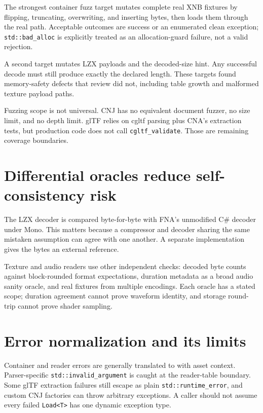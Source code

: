 The strongest container fuzz target mutates complete real XNB fixtures by flipping, truncating,
overwriting, and inserting bytes, then loads them through the real
 path.  Acceptable outcomes are success or an enumerated clean
exception; \texttt{std::bad\_alloc} is explicitly treated as an allocation-guard failure, not a
valid rejection.

A second target mutates LZX payloads and the decoded-size hint.  Any successful decode must still
produce exactly the declared length.  These targets found memory-safety defects that review did
not, including table growth and malformed texture payload paths.

Fuzzing scope is not universal.  CNJ has no equivalent document fuzzer, no size limit, and no
depth limit.  glTF relies on cgltf parsing plus CNA's extraction tests, but production code does
not call \texttt{cgltf\_validate}.  Those are remaining coverage boundaries.

\section{Differential oracles reduce self-consistency risk}

The LZX decoder is compared byte-for-byte with FNA's unmodified C\# decoder under Mono.  This
matters because a compressor and decoder sharing the same mistaken assumption can agree with one
another.  A separate implementation gives the bytes an external reference.

Texture and audio readers use other independent checks: decoded byte counts against block-rounded
format expectations, duration metadata as a broad audio sanity oracle, and real fixtures from
multiple encodings.  Each oracle has a stated scope; duration agreement cannot prove waveform
identity, and storage round-trip cannot prove shader sampling.

\section{Error normalization and its limits}

Container and reader errors are generally translated to  with
asset context.  Parser-specific \texttt{std::invalid\_argument} is caught at the reader-table
boundary.  Some glTF extraction failures still escape as plain \texttt{std::runtime\_error}, and
custom CNJ factories can throw arbitrary exceptions.  A caller should not assume every failed
\texttt{Load<T>} has one dynamic exception type.

